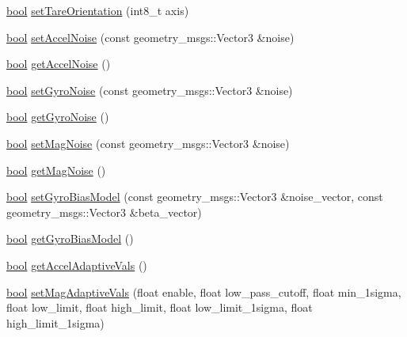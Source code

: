 \begin{DoxyCompactItemize}
\item 
\hyperlink{classbool}{bool} \hyperlink{classcl__microstrain__mips_1_1ClMicrostainMips_a84173859b79a7bad8861b7ea14f15c6a}{set\+Tare\+Orientation} (int8\+\_\+t axis)
\item 
\hyperlink{classbool}{bool} \hyperlink{classcl__microstrain__mips_1_1ClMicrostainMips_af003ab445879e23f969cca8e767a70f3}{set\+Accel\+Noise} (const geometry\+\_\+msgs\+::\+Vector3 \&noise)
\item 
\hyperlink{classbool}{bool} \hyperlink{classcl__microstrain__mips_1_1ClMicrostainMips_a6b75108e49aca71fdff9ac7fd83aecc0}{get\+Accel\+Noise} ()
\item 
\hyperlink{classbool}{bool} \hyperlink{classcl__microstrain__mips_1_1ClMicrostainMips_a26f7969c967cc7f83f556f566254e0ff}{set\+Gyro\+Noise} (const geometry\+\_\+msgs\+::\+Vector3 \&noise)
\item 
\hyperlink{classbool}{bool} \hyperlink{classcl__microstrain__mips_1_1ClMicrostainMips_a7e54b1b4fb3ccdc5d2a845e52caf2f17}{get\+Gyro\+Noise} ()
\item 
\hyperlink{classbool}{bool} \hyperlink{classcl__microstrain__mips_1_1ClMicrostainMips_a6c9825168b47aa42091e410da90f43c8}{set\+Mag\+Noise} (const geometry\+\_\+msgs\+::\+Vector3 \&noise)
\item 
\hyperlink{classbool}{bool} \hyperlink{classcl__microstrain__mips_1_1ClMicrostainMips_aaa3a569e4b555b0db5b3f3d02ae1b33e}{get\+Mag\+Noise} ()
\item 
\hyperlink{classbool}{bool} \hyperlink{classcl__microstrain__mips_1_1ClMicrostainMips_ac0a42062a2938fca9c982668909f7bff}{set\+Gyro\+Bias\+Model} (const geometry\+\_\+msgs\+::\+Vector3 \&noise\+\_\+vector, const geometry\+\_\+msgs\+::\+Vector3 \&beta\+\_\+vector)
\item 
\hyperlink{classbool}{bool} \hyperlink{classcl__microstrain__mips_1_1ClMicrostainMips_a9a4353f87640e524750cf919bdcdbf2d}{get\+Gyro\+Bias\+Model} ()
\item 
\hyperlink{classbool}{bool} \hyperlink{classcl__microstrain__mips_1_1ClMicrostainMips_aac0a271bd226038aca61077c08c6427b}{get\+Accel\+Adaptive\+Vals} ()
\item 
\hyperlink{classbool}{bool} \hyperlink{classcl__microstrain__mips_1_1ClMicrostainMips_ad28163dc7afc33064b337f6a76b99389}{set\+Mag\+Adaptive\+Vals} (float enable, float low\+\_\+pass\+\_\+cutoff, float min\+\_\+1sigma, float low\+\_\+limit, float high\+\_\+limit, float low\+\_\+limit\+\_\+1sigma, float high\+\_\+limit\+\_\+1sigma)
\item 

\end{DoxyCompactItemize}
